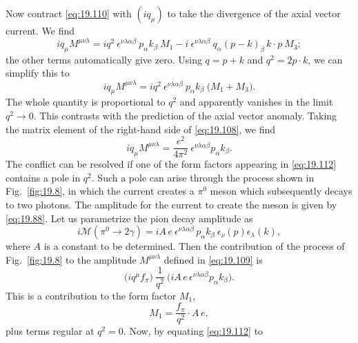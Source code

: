 Now contract \eqref{eq:19.110} with $(iq_\mu)$ to take the divergence of the
axial vector current.  We find
\begin{equation}
  iq_\mu M^{\mu\nu\lambda} = iq^2\ \epsilon^{\nu\lambda\alpha\beta}\ p_\alpha
    k_\beta\ M_1 - i\ \epsilon^{\nu\lambda\alpha\beta}\ q_\alpha(p-k)_\beta\,
    k\cdot p\ M_3 ;
  \label{eq:19.111}
\end{equation}
the other terms automatically give zero.  Using $q = p + k$ and
$q^2 = 2p\cdot k$, we can simplify this to
\begin{equation}
  iq_\mu M^{\mu\nu\lambda} = iq^2\ \epsilon^{\nu\lambda\alpha\beta}\ p_\alpha
    k_\beta\ \bigl( M_1 + M_3 \bigr) .
  \label{eq:19.112}
\end{equation}
The whole quantity is proportional to $q^2$ and apparently vanishes in the
limit $q^2\to 0$.  This contrasts with the prediction of the axial vector
anomaly.  Taking the matrix element of the right-hand side of
\eqref{eq:19.108}, we find
\begin{equation}
  iq_\mu M^{\mu\nu\lambda} = \frac{e^2}{4\pi^2}\ \epsilon^{\nu\lambda\alpha\beta}
    p_\alpha k_\beta .
  \label{eq:19.113}
\end{equation}
The conflict can be resolved if one of the form factors appearing in
\eqref{eq:19.112} contains a pole in $q^2$.  Such a pole can arise through
the process shown in Fig.~\ref{fig:19.8}, in which the current creates a
$\pi^0$ meson which subsequently decays to two photons.  The amplitude for
the current to create the meson is given by \eqref{eq:19.88}.  Let us
parametrize the pion decay amplitude as
\begin{equation}
  i\mathcal{M}(\pi^0 \to 2\gamma) = iA\,e\ \epsilon^{\nu\lambda\alpha\beta}\,
    p_\alpha k_\beta\ \epsilon_\nu(p)\epsilon_\lambda(k) ,
  \label{eq:19.114}
\end{equation}
where $A$ is a constant to be determined.  Then the contribution of the
process of Fig.~\ref{fig:19.8} to the amplitude $M^{\mu\nu\lambda}$ defined in
\eqref{eq:19.109} is
\begin{equation}
  \bigl( iq^\mu f_\pi \bigr)\ \frac{1}{q^2}\ \bigl( iA\,e\,
    \epsilon^{\nu\lambda\alpha\beta}p_\alpha k_\beta \bigr) .
  \label{eq:19.115}
\end{equation}
This is a contribution to the form factor $M_1$,
\begin{equation}
  M_1 = \frac{f_\pi}{q^2}\cdot A\,e ,
  \label{eq:19.116}
\end{equation}
plus terms regular at $q^2 = 0$.  Now, by equating \eqref{eq:19.112} to
